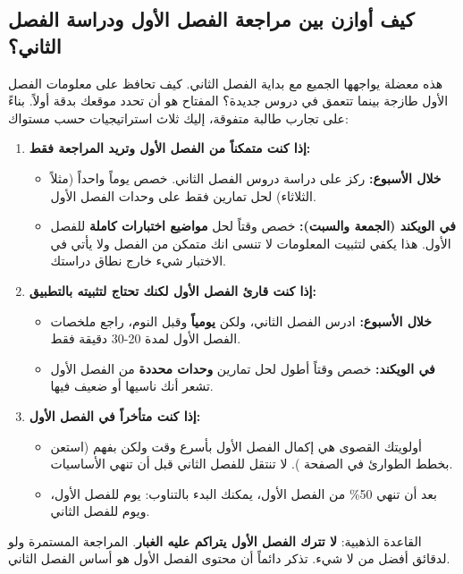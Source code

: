 \documentclass[12pt,a4paper]{book}
\begin{document}
	\subsection{كيف أوازن بين مراجعة الفصل الأول ودراسة الفصل الثاني؟}
	\label{sec:balance-semesters}
	
	هذه معضلة يواجهها الجميع مع بداية الفصل الثاني. كيف تحافظ على معلومات الفصل الأول طازجة بينما تتعمق في دروس جديدة؟ المفتاح هو أن تحدد موقعك بدقة أولاً. بناءً على تجارب طالبة متفوقة، إليك ثلاث استراتيجيات حسب مستواك:
	
	\begin{enumerate}
		\item \textbf{إذا كنت متمكناً من الفصل الأول وتريد المراجعة فقط:}
		\begin{itemize}
			\item \textbf{خلال الأسبوع:} ركز على دراسة دروس الفصل الثاني. خصص يوماً واحداً (مثلاً الثلاثاء) لحل تمارين فقط على وحدات الفصل الأول.
			\item \textbf{في الويكند (الجمعة والسبت):} خصص وقتاً لحل \textbf{مواضيع اختبارات كاملة} للفصل الأول. هذا يكفي لتثبيت المعلومات لا تنسى انك متمكن من الفصل ولا يأتي في الاختبار شيء خارج نطاق دراستك.
		\end{itemize}
		\item \textbf{إذا كنت قارئ الفصل الأول لكنك تحتاج لتثبيته بالتطبيق:}
		\begin{itemize}
			\item \textbf{خلال الأسبوع:} ادرس الفصل الثاني، ولكن \textbf{يومياً} وقبل النوم، راجع ملخصات الفصل الأول لمدة 20-30 دقيقة فقط.
			\item \textbf{في الويكند:} خصص وقتاً أطول لحل تمارين \textbf{وحدات محددة} من الفصل الأول تشعر أنك ناسيها أو ضعيف فيها.
		\end{itemize}
		\item \textbf{إذا كنت متأخراً في الفصل الأول:}
		\begin{itemize}
			\item أولويتك القصوى هي إكمال الفصل الأول بأسرع وقت ولكن بفهم (استعن بخطط الطوارئ في الصفحة \pageref{sec:psy-late-start-success}). لا تنتقل للفصل الثاني قبل أن تنهي الأساسيات. 
			\item بعد أن تنهي 50\% من الفصل الأول، يمكنك البدء بالتناوب: يوم للفصل الأول، ويوم للفصل الثاني.
		\end{itemize}
	\end{enumerate}
	
	القاعدة الذهبية: \textbf{لا تترك الفصل الأول يتراكم عليه الغبار}. المراجعة المستمرة ولو لدقائق أفضل من لا شيء. تذكر دائماً أن محتوى الفصل الأول هو أساس الفصل الثاني.
	
\end{document}
